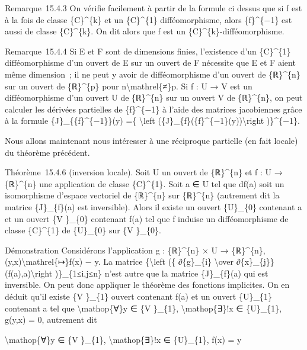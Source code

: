\documentclass[]{article}
\begin{document}
Remarque~15.4.3 On vérifie facilement à partir de la formule ci dessus
que si f est à la fois de classe \{C\}\^{}\{k\} et un \{C\}\^{}\{1\}
difféomorphisme, alors \{f\}\^{}\{−1\} est aussi de classe
\{C\}\^{}\{k\}. On dit alors que f est un
\{C\}\^{}\{k\}-difféomorphisme.

Remarque~15.4.4 Si E et F sont de dimensions finies, l'existence d'un
\{C\}\^{}\{1\} difféomorphisme d'un ouvert de E sur un ouvert de F
nécessite que E et F aient même dimension~; il ne peut y avoir de
difféomorphisme d'un ouvert de \{ℝ\}\^{}\{n\} sur un ouvert de
\{ℝ\}\^{}\{p\} pour n\textbackslash{}mathrel\{≠\}p. Si f : U → V est un
difféomorphisme d'un ouvert U de \{ℝ\}\^{}\{n\} sur un ouvert V de
\{ℝ\}\^{}\{n\}, on peut calculer les dérivées partielles de
\{f\}\^{}\{−1\} à l'aide des matrices jacobiennes grâce à la formule
\{J\}\_\{\{f\}\^{}\{−1\}\}(y) =\{ \textbackslash{}left
(\{J\}\_\{f\}(\{f\}\^{}\{−1\}(y))\textbackslash{}right )\}\^{}\{−1\}.

Nous allons maintenant nous intéresser à une réciproque partielle (en
fait locale) du théorème précédent.

Théorème~15.4.6 (inversion locale). Soit U un ouvert de \{ℝ\}\^{}\{n\}
et f : U → \{ℝ\}\^{}\{n\} une application de classe \{C\}\^{}\{1\}. Soit
a ∈ U tel que df(a) soit un isomorphisme d'espace vectoriel de
\{ℝ\}\^{}\{n\} sur \{ℝ\}\^{}\{n\} (autrement dit la matrice
\{J\}\_\{f\}(a) est inversible). Alors il existe un ouvert \{U\}\_\{0\}
contenant a et un ouvert \{V \}\_\{0\} contenant f(a) tel que f induise
un difféomorphisme de classe \{C\}\^{}\{1\} de \{U\}\_\{0\} sur \{V
\}\_\{0\}.

Démonstration Considérons l'application g : \{ℝ\}\^{}\{n\} × U →
\{ℝ\}\^{}\{n\}, (y,x)\textbackslash{}mathrel\{↦\}f(x) − y. La matrice
\{\textbackslash{}left (\{ ∂\{g\}\_\{i\} \textbackslash{}over
∂\{x\}\_\{j\}\} (f(a),a)\textbackslash{}right )\}\_\{1≤i,j≤n\} n'est
autre que la matrice \{J\}\_\{f\}(a) qui est inversible. On peut donc
appliquer le théorème des fonctions implicites. On en déduit qu'il
existe \{V \}\_\{1\} ouvert contenant f(a) et un ouvert \{U\}\_\{1\}
contenant a tel que \textbackslash{}mathop\{∀\}y ∈ \{V \}\_\{1\},
\textbackslash{}mathop\{∃\}!x ∈ \{U\}\_\{1\}, g(y,x) = 0, autrement dit

\textbackslash{}mathop\{∀\}y ∈ \{V \}\_\{1\},
\textbackslash{}mathop\{∃\}!x ∈ \{U\}\_\{1\}, f(x) = y
\end{document}

